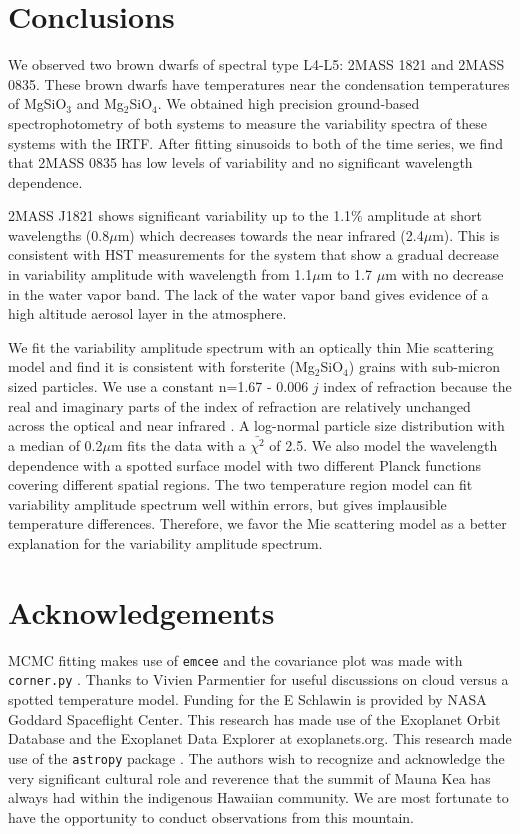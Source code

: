 \documentclass[twocolumn]{aastex6}
\begin{document}
\section{Conclusions}\label{sec:conclusions}

We observed two brown dwarfs of spectral type L4-L5: 2MASS 1821 and 2MASS 0835.
These brown dwarfs have temperatures near the condensation temperatures of MgSiO$_3$ and Mg$_2$SiO$_4$.
We obtained high precision ground-based spectrophotometry of both systems to measure the variability spectra of these systems with the IRTF.
After fitting sinusoids to both of the time series, we find that 2MASS 0835 has low levels of variability and no significant wavelength dependence.

2MASS J1821 shows significant variability up to the 1.1\% amplitude at short wavelengths (0.8$\mu$m) which decreases towards the near infrared (2.4$\mu$m).
This is consistent with HST measurements for the system that show a gradual decrease in variability amplitude with wavelength \citep{2016ApJ...826....8Y} from 1.1$\mu$m to 1.7 $\mu$m with no decrease in the water vapor band.
The lack of the water vapor band gives evidence of a high altitude aerosol layer in the atmosphere.

We fit the variability amplitude spectrum with an optically thin Mie scattering model and find it is consistent with forsterite (Mg$_2$SiO$_4$) grains with sub-micron sized particles.
We use a constant n=1.67 - 0.006 $j$ index of refraction because the real and imaginary parts of the index of refraction are relatively unchanged across the optical and near infrared \citep{scott1996forsterite}.
A log-normal particle size distribution with a median of 0.2$\mu$m fits the data with a $\bar{\chi^2}$ of 2.5.
We also model the wavelength dependence with a spotted surface model with two different Planck functions covering different spatial regions.
The two temperature region model can fit variability amplitude spectrum well within errors, but gives implausible temperature differences.
Therefore, we favor the Mie scattering model as a better explanation for the variability amplitude spectrum.

\section{Acknowledgements}
MCMC fitting makes use of \texttt{emcee} \citep{foreman-mackey2013emcee} and the covariance plot was made with \texttt{corner.py} \citep{foremanCorner}.
Thanks to Vivien Parmentier for useful discussions on cloud versus a spotted temperature model.
Funding for the E Schlawin is provided by NASA Goddard Spaceflight Center.
This research has made use of the Exoplanet Orbit Database and the Exoplanet Data Explorer at exoplanets.org.
This research made use of the \texttt{astropy} package \citep{astropy2013}. The authors wish to recognize and acknowledge the very significant cultural role and reverence that the summit of Mauna Kea has always had within the indigenous Hawaiian community. We are most fortunate to have the opportunity to conduct observations from this mountain.
\end{document}
